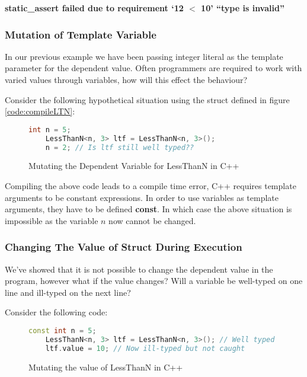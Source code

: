 \documentclass[a4paper,12pt]{report}
\begin{document}
\textbf{static\_assert failed due to requirement `12 $<$ 10' ``type is invalid''}

\subsubsection{Mutation of Template Variable}
In our previous example we have been passing integer literal as the template 
parameter for the dependent value. Often programmers are required to 
work with varied values through variables, how will this effect the behaviour? 

\par
Consider the following hypothetical situation using the struct defined in 
figure \ref{code:compileLTN}: 

\begin{figure}[H]
  \begin{lstlisting}[language=c++]     
    int n = 5;
    LessThanN<n, 3> ltf = LessThanN<n, 3>();
    n = 2; // Is ltf still well typed??
  \end{lstlisting}
  \caption{Mutating the Dependent Variable for LessThanN in C++}
\end{figure}

\par
Compiling the above code leads to a compile time error, C++ requires template 
arguments to be constant expressions. In order to use variables as template 
arguments, they have to be defined \textbf{const}. In which case the above 
situation is impossible as the variable $n$ now cannot be changed. 

\subsubsection{Changing The Value of Struct During Execution}
We've showed that it is not possible to change the dependent value in 
the program, however what if the value changes? Will a 
variable be well-typed on one line and ill-typed on the next line? 

\par
Consider the following code: 
\begin{figure}[H]
  \begin{lstlisting}[language=c++]     
    const int n = 5;
    LessThanN<n, 3> ltf = LessThanN<n, 3>(); // Well typed
    ltf.value = 10; // Now ill-typed but not caught
  \end{lstlisting}
  \caption{Mutating the value of LessThanN in C++}
\end{figure}
\end{document}
